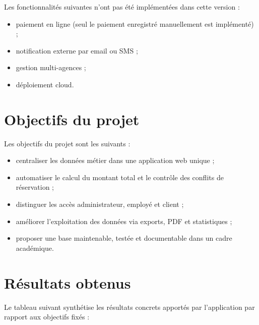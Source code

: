 Les fonctionnalités suivantes n'ont pas été implémentées dans cette version :
\begin{itemize}
  \item paiement en ligne (seul le paiement enregistré manuellement est implémenté) ;
  \item notification externe par email ou SMS ;
  \item gestion multi-agences ;
  \item déploiement cloud.
\end{itemize}

\section{Objectifs du projet}
Les objectifs du projet sont les suivants :
\begin{itemize}
  \item centraliser les données métier dans une application web unique ;
  \item automatiser le calcul du montant total et le contrôle des conflits de réservation ;
  \item distinguer les accès administrateur, employé et client ;
  \item améliorer l'exploitation des données via exports, PDF et statistiques ;
  \item proposer une base maintenable, testée et documentable dans un cadre académique.
\end{itemize}

\section{Résultats obtenus}
Le tableau suivant synthétise les résultats concrets apportés par l'application par rapport aux objectifs fixés :

